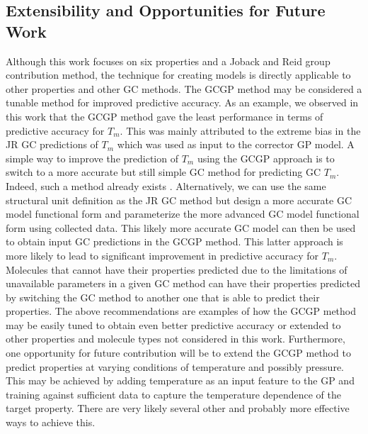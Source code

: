 \documentclass[journal=jacsat,manuscript=article, ]{achemso}
\begin{document}
\subsection{Extensibility and Opportunities for Future Work}
Although this work focuses on six properties and a Joback and Reid group contribution method, the technique for creating models is directly applicable to other properties and other GC methods. 
The GCGP method may be considered a tunable method for improved predictive accuracy. As an example, we observed in this work that the GCGP method gave the least performance in terms of predictive accuracy for $T_m$. This was mainly attributed to the extreme bias in the JR GC predictions of $T_m$ which was used as input to the corrector GP model. 
A simple way to improve the prediction of $T_m$ using the GCGP approach is to switch to a more accurate but still simple GC method for predicting GC $T_m$. Indeed, such a method already exists \cite{perezponceNewGroupContribution2013}. 
Alternatively, we can use the same structural unit definition as the JR GC method but design a more accurate GC model functional form and parameterize the more advanced GC model functional form using collected data. This likely more accurate GC model can then be used to obtain input GC predictions in the GCGP method. This latter approach is more likely to lead to significant improvement in predictive accuracy for $T_m$. 
Molecules that cannot have their properties predicted due to the limitations of unavailable parameters in a given GC method can have their properties predicted by switching the GC method to another one that is able to predict their properties. 
The above recommendations are examples of how the GCGP method may be easily tuned to obtain even better predictive accuracy or extended to other properties and molecule types not considered in this work. 
Furthermore, one opportunity for future contribution will be to extend the GCGP method to predict properties at varying conditions of temperature and possibly pressure. This may be achieved by adding temperature as an input feature to the GP and training against sufficient data to capture the temperature dependence of the target property. There are very likely several other and probably more effective ways to achieve this.
\end{document}
